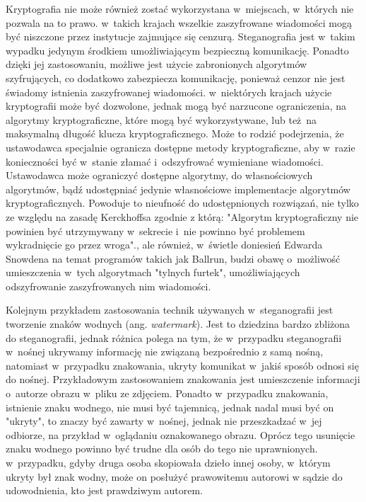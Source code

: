 \documentclass[a4paper, twoside, 12pt]{report}
\begin{document}
        Kryptografia nie może również zostać wykorzystana w~miejscach, w~których
        nie pozwala na to prawo.\cite{CRYPTOGRAFYLAW} w~takich krajach wszelkie
        zaszyfrowane wiadomości mogą być niszczone przez instytucje zajmujące się
        cenzurą. Steganografia jest w~takim
        wypadku jedynym środkiem umożliwiającym bezpieczną komunikację. Ponadto
        dzięki jej zastosowaniu, możliwe jest użycie zabronionych algorytmów szyfrujących,
        co dodatkowo zabezpiecza komunikację, ponieważ cenzor nie jest świadomy
        istnienia zaszyfrowanej wiadomości. w~niektórych krajach użycie kryptografii
        może być dozwolone, jednak mogą być narzucone ograniczenia, na algorytmy
        kryptograficzne, które mogą być wykorzystywane, lub też na maksymalną
        długość klucza kryptograficznego. Może to rodzić podejrzenia, że ustawodawca
        specjalnie ogranicza dostępne metody kryptograficzne, aby w~razie konieczności
        być w~stanie złamać i~odszyfrować wymieniane wiadomości. Ustawodawca
        może ograniczyć dostępne algorytmy, do własnościowych algorytmów, bądź
        udostępniać jedynie własnościowe implementacje algorytmów kryptograficznych.
        Powoduje to nieufność do udostępnionych rozwiązań, nie tylko ze względu
        na zasadę Kerckhoffsa zgodnie z którą:
        "Algorytm kryptograficzny nie powinien być utrzymywany w~sekrecie i~nie powinno
        być problemem wykradnięcie go przez wroga".\cite{KERCKHOS}, ale również,
        w~świetle doniesień Edwarda Snowdena na temat programów takich jak
        Ballrun\cite{WIKI:BALLRUN}, budzi obawę o~możliwość umieszczenia w~tych
        algorytmach "tylnych furtek", umożliwiających odszyfrowanie zaszyfrowanych
        nim wiadomości.

        Kolejnym przykładem zastosowania technik używanych w~steganografii jest
        tworzenie znaków wodnych (ang. \emph{watermark}). Jest to dziedzina bardzo zbliżona do steganografii,
        jednak różnica polega na tym, że w~przypadku steganografii w~nośnej ukrywamy
        informację nie związaną bezpośrednio z samą nośną, natomiast w~przypadku znakowania,
        ukryty komunikat w~jakiś sposób odnosi się do nośnej. Przykładowym zastosowaniem
        znakowania jest umieszczenie informacji o~autorze obrazu w~pliku ze zdjęciem.
        Ponadto w~przypadku znakowania, istnienie znaku wodnego, nie musi być tajemnicą,
        jednak nadal musi być on "ukryty", to znaczy być zawarty w~nośnej, jednak
        nie przeszkadzać w~jej odbiorze, na przykład w~oglądaniu oznakowanego obrazu.
        Oprócz tego usunięcie znaku wodnego powinno być trudne dla osób do tego nie
        uprawnionych. w~przypadku, gdyby druga osoba skopiowała dzieło innej osoby,
        w~którym ukryty był znak wodny, może on posłużyć prawowitemu autorowi w
        sądzie do udowodnienia, kto jest prawdziwym autorem.
\end{document}
